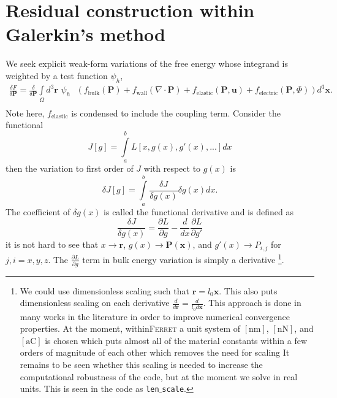 \documentclass[16pt]{article} %
\begin{document}
\section{Residual construction within Galerkin's method}
%
We seek explicit weak-form variations of the free energy whose integrand is weighted by a test function $\psi_h$,
%
\begin{eqnarray}\nonumber
\frac{\delta F}{\delta \textbf{P} }= \frac{\delta}{\delta \textbf{P}} \int\limits_\Omega d^3 \textbf{r} \,\,\psi_h \,\,\,\,\left( f_\mathrm{bulk} (\textbf{P}) + f_\mathrm{wall} (\nabla \cdot \textbf{P}) + f_\mathrm{elastic}(\textbf{P}, \textbf{u}) + f_\mathrm{electric}(\textbf{P}, \Phi) \right)d^3 {\boldsymbol x}. \\ \nonumber
\end{eqnarray}
%
Note here, $f_\mathrm{elastic}$ is condensed to include the coupling term. Consider the functional
%
$$J[g] = \int\limits_a^b L[x, g(x), g'(x),...]dx$$
%
then the variation to first order of $J$ with respect to $g(x)$ is
%
$$\delta J[g] = \int\limits_a^b \frac{\delta J}{\delta g(x)} \delta g(x) dx.$$
%
The coefficient of $\delta g(x)$ is called the functional derivative and is defined as
%
\begin{equation}\tag{13}
\frac{\delta J}{\delta g(x)} = \frac{\partial L}{\partial g} - \frac{d}{dx} \frac{\partial L}{\partial g'}
\end{equation}
%
it is not hard to see that $x \to \textbf{r}$, $g(x) \to \textbf{P} ({\boldsymbol x})$, and $g'(x) \to P_{i,j}$ for $j,i = x,y,z$. The $\frac{\partial L}{\partial g}$ term in bulk energy variation is simply a derivative \footnote[1]{%
We could use dimensionless scaling such that $\textbf{r} = l_0 {\boldsymbol x}$.
%
This also puts dimensionless scaling on each derivative $\frac{d}{d \textbf{r}} = \frac{d}{l_0 d{\boldsymbol x}}$. 
%
This approach is done in many works in the literature \cite{Li2001, Ng2012} in order to improve numerical convergence properties.
%
At the moment, within\textsc{Ferret} a unit system of $[\mathrm{nm}]$, $[\mathrm{nN}]$, and $[\mathrm{aC}]$ is chosen which puts almost all of the material constants within a few orders of magnitude of each other which removes the need for scaling
%
It remains to be seen whether this scaling is needed to increase the computational robustness of the code, but at the moment we solve in real units. 
%
This is seen in the code as \texttt{len$\_$scale}.}. 

%
\end{document}
